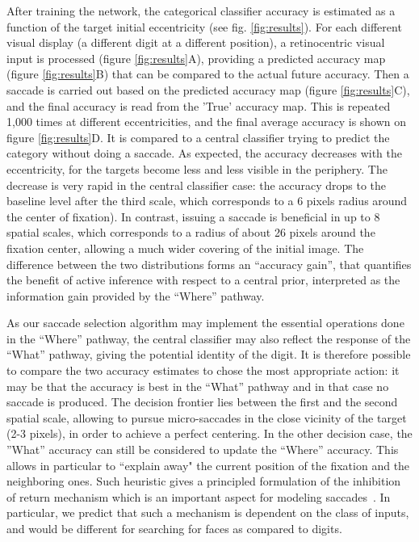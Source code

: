 After training the network, the categorical classifier accuracy is estimated as a function of the target initial eccentricity (see fig. \ref{fig:results}). For each different visual display (a different digit at a different position), a retinocentric visual input is processed (figure \ref{fig:results}A), providing a predicted accuracy map (figure \ref{fig:results}B) that can be compared to the actual future accuracy. Then a saccade is carried out based on the predicted accuracy map (figure \ref{fig:results}C), and the final accuracy is read from the 'True' accuracy map. This is repeated 1,000 times at different eccentricities, and the final average accuracy is shown on figure \ref{fig:results}D. It is compared to a central classifier trying to predict the category without doing a saccade.  
As expected, the  accuracy decreases with the eccentricity, for the targets become less and less visible in the periphery. 
The decrease is very rapid in the central classifier case: the accuracy drops to the baseline level after the third scale, which corresponds to a 6 pixels radius around the center of fixation). In contrast, issuing a saccade is beneficial in up to 8 spatial scales, which corresponds to a radius of about 26 pixels around the fixation center, allowing a much wider covering of the initial image. The difference between the two distributions forms an ``accuracy gain'', that quantifies the benefit of active inference with respect to a central prior, interpreted as the information gain provided by the ``Where'' pathway.


As our saccade selection algorithm may implement the essential operations done in the ``Where'' pathway, the central classifier may also reflect the response of the ``What'' pathway,  
giving the potential identity of the digit. %
It is therefore possible to compare the two accuracy estimates to chose the most appropriate action: it may be that the  accuracy is best in the ``What'' pathway and in that case no saccade is produced. 
The decision frontier lies between the first and the second spatial scale, allowing to pursue micro-saccades in the close vicinity of the target (2-3 pixels), in order to achieve a perfect centering.
In the other decision case, the ''What'' accuracy can still be considered to update the ``Where'' accuracy. 
This allows in particular to ``explain away" the current position of the fixation and the neighboring ones.
Such heuristic gives a principled formulation of the inhibition of return mechanism which is an important aspect for modeling saccades~\citep{Itti01}. In particular, we predict that such a mechanism is dependent on the class of inputs, and would be different for searching for faces as compared to digits.
